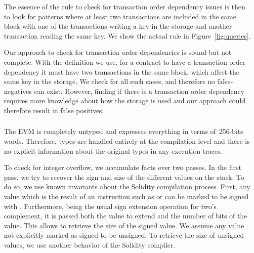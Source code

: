 The essence of the rule to check for transaction order dependency issues is then to look for patterns where at least two transactions are included in the same block with one of the transactions writing a key in the storage and another transaction reading the same key. We show the actual rule in Figure~\ref{fig:queries}.

\correctness Our approach to check for transaction order dependencies is sound but not complete. With the definition we use, for a contract to have a transaction order dependency it must have two transactions in the same block, which affect the same key in the storage. We check for all such cases, and therefore no false-negatives can exist. However, finding if there is a transaction order dependency requires more knowledge about how the storage is used and our approach could therefore result in false positives.


\subsubsection{\integeroverflow}
\label{ssec:method-io}

%
The EVM is completely untyped and expresses everything in terms of~256-bits words. Therefore, types are handled entirely at the compilation level and there is no explicit information about the original types in any execution traces.

To check for integer overflow, we accumulate facts over two passes. In the first pass, we try to recover the sign and size of the different values on the stack. To do so, we use known invariants about the Solidity compilation process. First, any value which is the result of an instruction such as  or  can be marked to be signed with . Furthermore,  being the usual sign extension operation for two's complement, it is passed both the value to extend and the number of bits of the value. This allows to retrieve the size of the signed value. We assume any value not explicitly marked as signed to be unsigned. To retrieve the size of unsigned values, we use another behavior of the Solidity compiler. 

